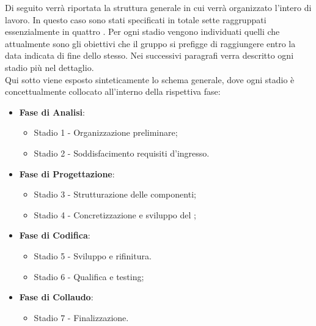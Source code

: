 Di seguito verrà riportata la struttura generale in cui verrà organizzato l'intero  di lavoro. In questo caso sono stati specificati in totale sette  raggruppati essenzialmente in quattro . Per ogni stadio vengono individuati quelli che attualmente sono gli obiettivi che il gruppo \Gruppo{} si prefigge di raggiungere entro la data indicata di fine dello stesso. Nei successivi paragrafi verra descritto ogni stadio più nel dettaglio.\\
Qui sotto viene esposto sinteticamente lo schema generale, dove ogni stadio è concettualmente collocato all'interno della rispettiva fase:

\begin{itemize}
    \item \textbf{Fase di Analisi}:
    \begin{itemize}
        \item Stadio 1 - Organizzazione preliminare;
        \item Stadio 2 - Soddisfacimento requisiti d'ingresso.
    \end{itemize}

    \item \textbf{Fase di Progettazione}:
    \begin{itemize}
        \item Stadio 3 - Strutturazione delle componenti;
        \item Stadio 4 - Concretizzazione e sviluppo del ;
    \end{itemize}

    \item \textbf{Fase di Codifica}:
    \begin{itemize}  
        \item Stadio 5 - Sviluppo e rifinitura.
        \item Stadio 6 - Qualifica e testing;
    \end{itemize}

    \item \textbf{Fase di Collaudo}:
    \begin{itemize}        
        \item Stadio 7 - Finalizzazione.
    \end{itemize}
\end{itemize}

